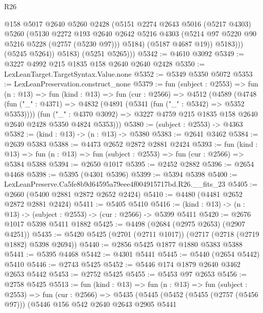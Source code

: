 \begin{lexlean}{R26}
\begin{coremodule}
                  @158
                  @5017
                  @2640
                  @5260
                  @2428
                  (@5151
                    @2274
                    @2643
                    @5016
                    (@5217 @4303)
                    @5260
                    (@5130
                      @2272
                      @193
                      @2640
                      @2642
                      @5216
                      @4303
                      (@5214 @97 @5220 @90 @5216 @5228 (@2757 (@5230 @97)))
                      @5184)
                    (@5187 @4687 @19))
                  @5183)))
            (@5245 @5264))
          @5183)
        (@5251 @5265)))
@5342 := @4610 @3092
@5349 := @3227 @4992 @215 @1835 @158 @2640 @2640 @2428
@5350 := LexLeanTarget.TargetSyntax.Value.none
@5352 := @5349 @5350 @5072
@5353 := LexLeanPreservation.construct_none
@5379 := fun (subject : @2553) =>
  fun (n : @13) =>
  fun (kind : @13) =>
  fun (cur : @2566) =>
  @4512
    (@4589
      (@4748
        (fun ("_" : @4371) => @4832 (@4891 (@5341 (fun ("_" : @5342) => @5352 @5353))))
        (fun ("_" : @4370 @3092) =>
        @3227 @4759 @215 @1835 @158 @2640 @2640 @2428 @5350 @4824 @5353)))
@5380 := (subject : @2553) -> @4363
@5382 := (kind : @13) -> (n : @13) -> @5380
@5383 := @2641 @3462
@5384 := @2639 @5383
@5388 := @4473 @2652 @2872 @2881 @2424
@5393 := fun (kind : @13) =>
  fun (n : @13) => fun (subject : @2553) => fun (cur : @2566) => @5384 @5388
@5394 := @2650 @1017
@5395 := @2452 @2882
@5396 := @2654 @4468
@5398 := @5395 (@4301 @5396)
@5399 := @5394 @5398
@5400 := LexLeanPreserve.Ca5fe8b9d64595a79eee4f004915717bd.R26.__fits_23
@5405 := @2660 (@5400 @2881 @2872 @2652 @2424)
@5410 := @4480 (@4481 @2652 @2872 @2881 @2424)
@5411 := @5405 @5410
@5416 := (kind : @13) -> (n : @13) -> (subject : @2553) -> (cur : @2566) -> @5399 @5411
@5420 := @2676 @1017 @5398 @5411 @1882
@5425 := @4498 (@2684 (@2975 @2653) (@2907 @4251))
@5435 := @5420 @5425 (@2701 (@2711 @1017)) (@2717 (@2718 (@2719 @1882) @5398 @2694))
@5440 := @2856 @5425 @1877 @1880 @5383 @5388
@5441 := @5395 @4468
@5442 := @4301 @5441
@5445 := @5440 (@2654 @5442) @5410
@5446 := @2743 @5425
@5452 := @5446 @174 @1879 @2640 @3462 @2653 @5442
@5453 := @2752 @5425
@5455 := @5453 @97 @2653
@5456 := @2758 @5425
@5513 := fun (kind : @13) =>
  fun (n : @13) =>
  fun (subject : @2553) =>
  fun (cur : @2566) =>
  @5435
    (@5445
      (@5452
        (@5455 (@2757 (@5456 @97)))
        (@5446
          @156
          @542
          @2640
          @2643
          @2905
          @5441

\end{coremodule}
\end{lexlean}
